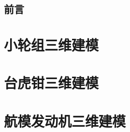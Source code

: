 \documentclass[a4paper,twoside]{book}
\begin{document}

\title{}
\author{}
\date{\today}
\maketitle
\frontmatter
\tableofcontents
\chapter*{前言}
\mainmatter
\graphicspath{{pdf/}{png/}}
\part{小轮组三维建模}






\part{台虎钳三维建模}








\part{航模发动机三维建模}









\backmatter
\appendix
\noindent
\begin{landscape}

\end{landscape}
\printindex
\end{document}
